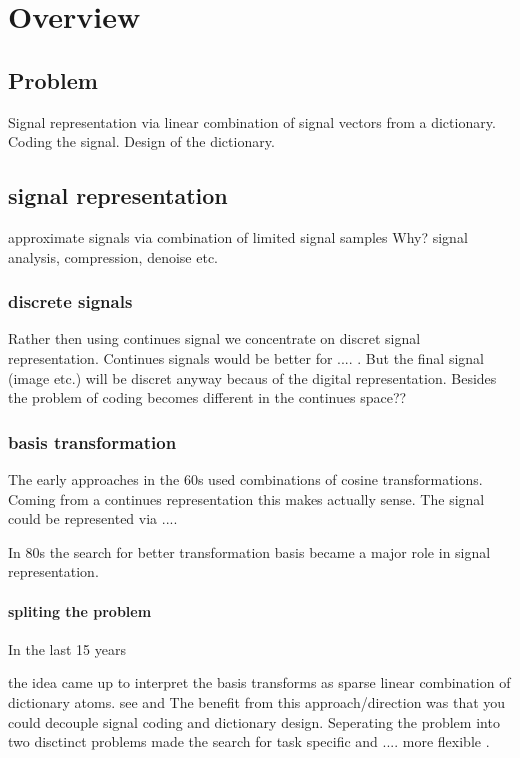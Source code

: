 \chapter{Overview}

\section{Problem}
Signal representation via linear combination of signal vectors from a dictionary.
Coding the signal. Design of the dictionary.

\section{signal representation}
approximate signals via combination of limited signal samples
Why?
signal analysis, compression, denoise etc.
\subsection{discrete signals}
Rather then using continues signal we concentrate on discret signal representation.
Continues signals would be better for .... . But the final signal (image etc.) will be discret anyway becaus of the 
digital representation. Besides the problem of coding becomes different in the continues space??

\subsection{basis transformation}
The early approaches in the 60s used combinations of cosine transformations. Coming from a continues representation this makes 
actually sense. The signal could be represented via ....

In 80s the search for better transformation basis became a major role in signal representation. \cite{}

\subsubsection{spliting the problem}
In the last 15 years 

the idea came up to interpret the basis transforms as sparse linear combination of dictionary atoms.
see \cite{} and \cite{}
The benefit from this approach/direction was that you could decouple signal coding and dictionary design.
Seperating the problem into two disctinct problems made the search for task specific and .... more flexible \cite{?}.


